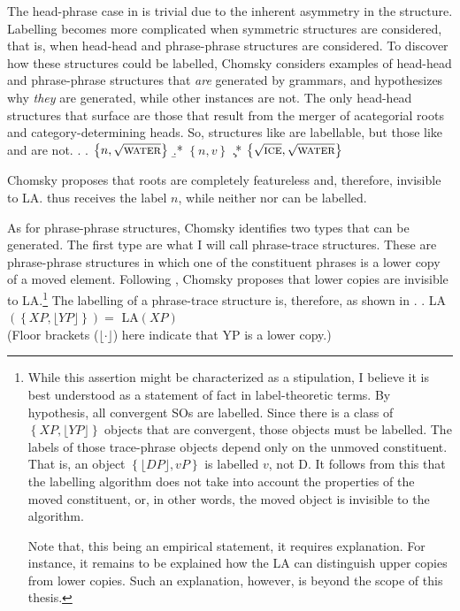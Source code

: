 \documentclass[MilwayThesis]{subfiles}
\begin{document}
The head-phrase case in \Last is trivial due to the inherent asymmetry in the structure.
Labelling becomes more complicated when symmetric structures are considered, that is, when head-head and phrase-phrase structures are considered.
To discover how these structures could be labelled, Chomsky considers examples of head-head and phrase-phrase structures that \textit{are} generated by grammars, and hypothesizes why \textit{they} are generated, while other instances are not.
The only head-head structures that surface are those that result from the merger of acategorial roots and category-determining heads.
So, structures like \Next[a] are labellable, but those like \Next[b] and \Next[c] are not.
\ex.
\a. $\left\{ n, \sqrt{\textsc{water}}\right\}$
\b.* $\left\{ n, v\right\}$
\c.* $\left\{ \sqrt{\textsc{ice}}, \sqrt{\textsc{water}} \right\}$

Chomsky proposes that roots are completely featureless and, therefore, invisible to LA.
\Last[a] thus receives the label $n$, while neither \Last[b] nor \Last[c] can be labelled.

As for phrase-phrase structures, Chomsky identifies two types that can be generated.
The first type are what I will call phrase-trace structures.
These are phrase-phrase structures in which one of the constituent phrases is a lower copy of a moved element.
Following \textcite{moro2000dynamic}, Chomsky proposes that lower copies are invisible to LA.\footnote{
	While this assertion might be characterized as a stipulation, I believe it is best understood as a statement of fact in label-theoretic terms.
	By hypothesis, all convergent SOs are labelled.
	Since there is a class of $\left\{XP, \lfloor YP\rfloor \right\}$ objects that are convergent, those objects must be labelled.
	The labels of those trace-phrase objects depend only on the unmoved constituent.
	That is, an object $\left\{ \lfloor DP\rfloor, vP \right\}$ is labelled $v$, not D.
	It follows from this that the labelling algorithm does not take into account the properties of the moved constituent, or, in other words, the moved object is invisible to the algorithm.

	Note that, this being an empirical statement, it requires explanation.
	For instance, it remains to be explained how the LA can distinguish upper copies from lower copies.
	Such an explanation, however, is beyond the scope of this thesis.
}
The labelling of a phrase-trace structure is, therefore, as shown in \Next.
\ex. LA$(\left\{ XP, \lfloor YP\rfloor \right\}) =$ LA$(XP)$\\
(Floor brackets ($\lfloor\cdot\rfloor$) here indicate that YP is a lower copy.)
\end{document}
